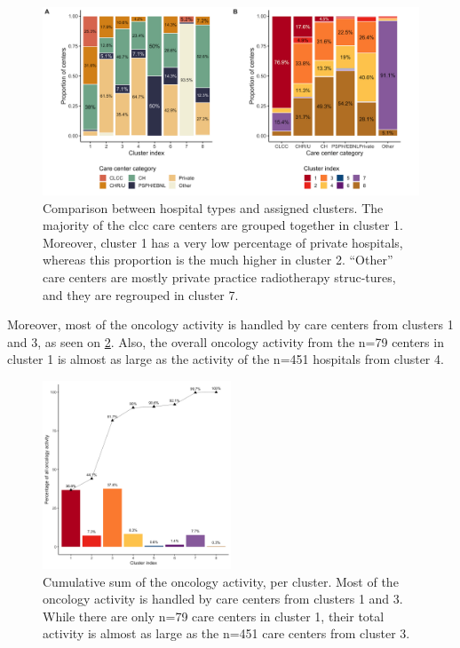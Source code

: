 \begin{figure}[h]
    \includegraphics[width=\textwidth]{images/camion/supplemental/sup_fig2_categories_per_cluster.png}
    \centering
    \caption{
        Comparison between hospital types and assigned clusters. The majority of the \ac{clcc} care centers are grouped together in cluster 1. Moreover, cluster 1 has a very low percentage of private hospitals, whereas this proportion is the much higher in cluster 2. “Other” care centers are mostly private practice radiotherapy struc-tures, and they are regrouped in cluster 7.
    }
    \label{fig:clustering-categories}
\end{figure}

Moreover, most of the oncology activity is handled by care centers from clusters 1 and 3, as seen on \cref{fig:clustering-cumulative}. Also, the overall oncology activity from the n=79 centers in cluster 1 is almost as large as the activity of the n=451 hospitals from cluster 4.

\begin{figure}[h]
    \includegraphics[width=0.5\textwidth]{images/camion/supplemental/sup_fig3_nb_stays_per_cluster.png}
    \centering
    \caption{
        Cumulative sum of the oncology activity, per cluster. Most of the oncology activity is handled by care centers from clusters 1 and 3. While there are only n=79 care centers in cluster 1, their total activity is almost as large as the n=451 care centers from cluster 3.
    }
    \label{fig:clustering-cumulative}
\end{figure}

